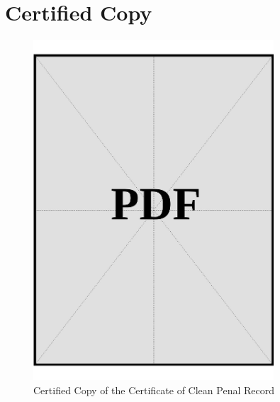\clearpage

\section*{Certified Copy}
\vspace*{\fill}
\begin{figure}[h]
    \centering
    \includegraphics[page=1, width=0.8\textwidth]{../application-docs/applicant/police-clearance-certificate/certified-copies.pdf}
    \caption{Certified Copy of the Certificate of Clean Penal Record}
    \label{fig:police-certified-copy}
\end{figure}
\vspace*{\fill}
\clearpage